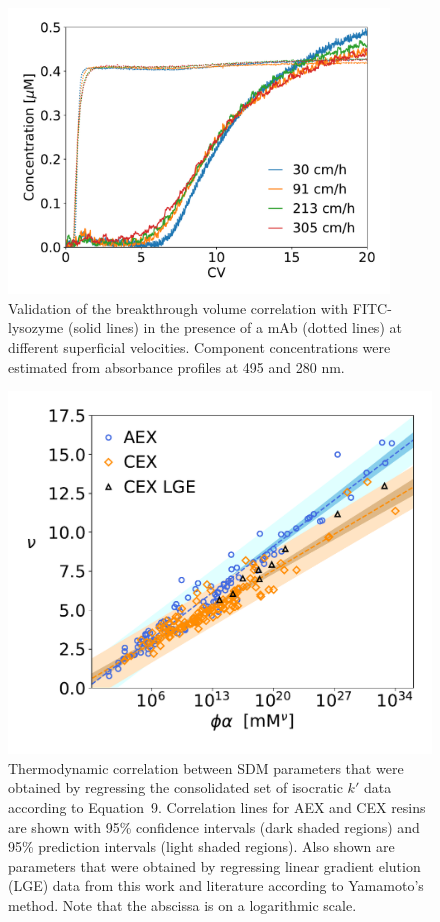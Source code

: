 \documentclass[11pt,a4paper]{article}
\begin{document}
\begin{figure}[bp]
    \centering
    \includegraphics[width=0.9\textwidth]{figure_6}
    \caption{Validation of the breakthrough volume correlation with FITC-lysozyme (solid lines) in the presence of a mAb (dotted lines) at different superficial velocities. Component concentrations were estimated from absorbance profiles at 495 and 280 nm.}
    \label{fig:validation with FITC lysozyme}
\end{figure}


\begin{figure}[htbp]
    \centering
    \includegraphics[width=\textwidth]{figure_7}
    \caption{
    Thermodynamic correlation between SDM parameters that were obtained by regressing the consolidated set of isocratic $k'$ data according to Equation~9. Correlation lines for AEX and CEX resins are shown with 95\% confidence intervals (dark shaded regions) and 95\% prediction intervals (light shaded regions). Also shown are parameters that were obtained by regressing linear gradient elution (LGE) data from this work and literature according to Yamamoto's method. Note that the abscissa is on a logarithmic scale.
    }
    \label{fig:sdm parameter correlation}
\end{figure}
\end{document}
